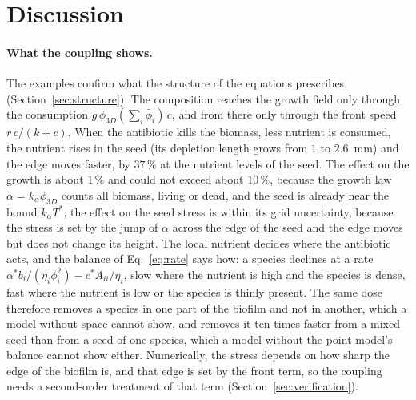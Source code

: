 \documentclass[11pt,a4paper]{article}
\newcommand{\phiD}{\phi_{3D}}
\newcommand{\lv}{\textstyle\sum_i\bar\phi_i}
\begin{document}
\section{Discussion}
\label{sec:discussion}

\paragraph{What the coupling shows.} The examples confirm what the structure of the equations prescribes (Section~\ref{sec:structure}). The composition reaches the growth field only through the consumption $g\,\phiD(\lv)\,c$, and from there only through the front speed $r\,c/(k+c)$. When the antibiotic kills the biomass, less nutrient is consumed, the nutrient rises in the seed (its depletion length grows from $1$ to $2.6$~mm) and the edge moves faster, by $37\,\%$ at the nutrient levels of the seed. The effect on the growth is about $1\,\%$ and could not exceed about $10\,\%$, because the growth law $\dot\alpha=k_\alpha\phiD$ counts all biomass, living or dead, and the seed is already near the bound $k_\alpha T^*$; the effect on the seed stress is within its grid uncertainty, because the stress is set by the jump of $\alpha$ across the edge of the seed and the edge moves but does not change its height. The local nutrient decides where the antibiotic acts, and the balance of Eq.~\eqref{eq:rate} says how: a species declines at a rate $\alpha^*b_i/(\eta_i\phi_i^2)-c^*A_{ii}/\eta_i$, slow where the nutrient is high and the species is dense, fast where the nutrient is low or the species is thinly present. The same dose therefore removes a species in one part of the biofilm and not in another, which a model without space cannot show, and removes it ten times faster from a mixed seed than from a seed of one species, which a model without the point model's balance cannot show either. Numerically, the stress depends on how sharp the edge of the biofilm is, and that edge is set by the front term, so the coupling needs a second-order treatment of that term (Section~\ref{sec:verification}).
\end{document}
